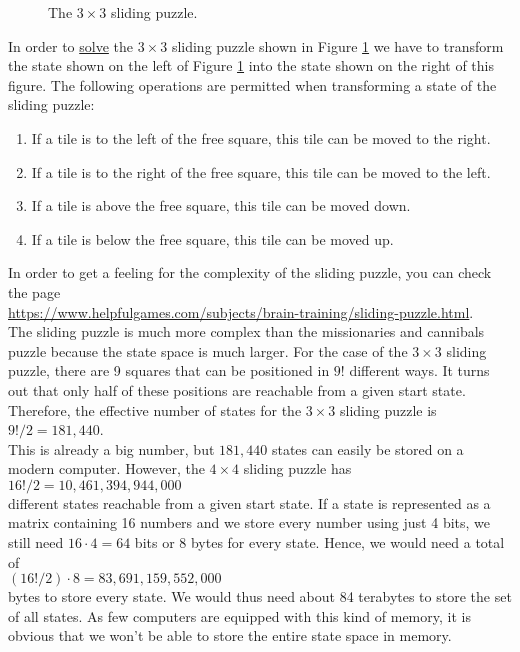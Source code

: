 \begin{figure}[!ht]
\centering
{}
\caption{The $3 \times 3$ sliding puzzle.}
\label{fig:8-puzzle.pdf}
\end{figure}

In order to \href{http://www.artbylogic.com/puzzles/numSlider/numberShuffle.htm?rows=3&cols=3&sqr=1}{solve} the $3 \times 3$
sliding puzzle shown in Figure \ref{fig:8-puzzle.pdf} we have to transform the state shown on the left of
Figure \ref{fig:8-puzzle.pdf} into the state shown on the right of this figure.  The following operations are permitted
when transforming a state of the sliding puzzle:
\begin{enumerate}
\item If a tile is to the left  of the free square, this tile can be moved to the right.
\item If a tile is to the right of the free square, this tile can be moved to the left.
\item If a tile is above           the free square, this tile can be moved down.
\item If a tile is below           the free square, this tile can be moved up.
\end{enumerate}
In order to get a feeling for the complexity of the sliding puzzle, you can check the page
\\[0.2cm]
\hspace*{1.3cm}
\href{https://www.helpfulgames.com/subjects/brain-training/sliding-puzzle.html}{https://www.helpfulgames.com/subjects/brain-training/sliding-puzzle.html}.
\\[0.2cm]
The sliding puzzle is much more complex than the missionaries and cannibals puzzle because the
state space is much larger.  For the case of the $3 \times 3$ sliding puzzle, there are 9 squares
that can be positioned in $9!$ different ways.  It turns out that only half of these positions are
reachable from a given start state.  Therefore, the effective number of states for the $3 \times 3$
sliding puzzle is
\\[0.2cm]
\hspace*{1.3cm}
$9! / 2 = 181,440$.
\\[0.2cm]
This is already a big number, but $181,440$ states can easily be stored on a modern computer.  However, the
$4 \times 4$ sliding puzzle has
\\[0.2cm]
\hspace*{1.3cm}
$16!/2 = 10,461,394,944,000$
\\[0.2cm]
different states reachable from a given start state.  If a state is represented as a matrix containing
16 numbers and we store every number using just 4 bits, we still need $16 \cdot 4 = 64$ bits or 8
bytes for every state.  Hence, we would need a total of
\\[0.2cm]
\hspace*{1.3cm}
$(16! / 2) \cdot 8 = 83,691,159,552,000$
\\[0.2cm]
bytes to store every state. We would thus need about 84 terabytes to store the set of all states.  As few
computers are equipped with this kind of memory, it is obvious that we won't be able to store the
entire state space in memory.

